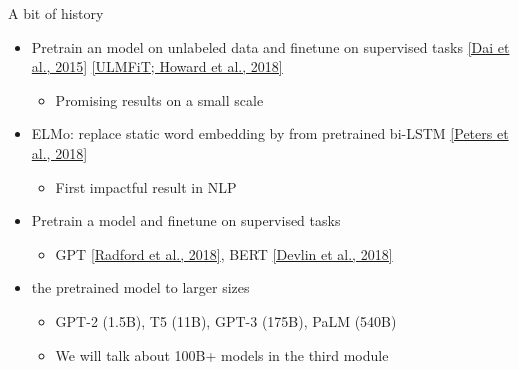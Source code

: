 \documentclass[usenames,dvipsnames,notes,11pt,aspectratio=169,hyperref={colorlinks=true, linkcolor=blue}]{beamer}
\begin{document}
\begin{frame}
    {A bit of history}
    \begin{itemize}[<+->]
        \item Pretrain an  model on unlabeled data and finetune on supervised tasks
            \href{https://arxiv.org/pdf/1511.01432.pdf}{[Dai et al., 2015]}
            \href{https://arxiv.org/pdf/1511.01432.pdf}{[ULMFiT; Howard et al., 2018]}
            \begin{itemize}[<.->]
                \item Promising results on a small scale
            \end{itemize}
        \item ELMo: replace static word embedding by  from pretrained bi-LSTM \href{https://arxiv.org/abs/1802.05365}{[Peters et al., 2018]}
            \begin{itemize}[<.->]
                \item First impactful result in NLP
            \end{itemize}
        \item Pretrain a  model and finetune on supervised tasks 
            \begin{itemize}[<.->]
                \item GPT \href{https://s3-us-west-2.amazonaws.com/openai-assets/research-covers/language-unsupervised/language_understanding_paper.pdf}{[Radford et al., 2018]},
                    BERT \href{https://arxiv.org/abs/1810.04805}{[Devlin et al., 2018]}
            \end{itemize}
        \item {} the pretrained model to larger sizes
            \begin{itemize}[<.->]
                \item GPT-2 (1.5B), T5 (11B), GPT-3 (175B), PaLM (540B) 
                \item We will talk about 100B+ models in the third module
            \end{itemize}
    \end{itemize}
\end{frame}
\end{document}
